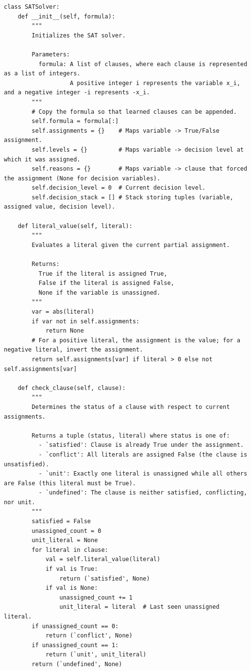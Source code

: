 \begin{lstlisting}
class SATSolver:
    def __init__(self, formula):
        """
        Initializes the SAT solver.
        
        Parameters:
          formula: A list of clauses, where each clause is represented as a list of integers.
                   A positive integer i represents the variable x_i, and a negative integer -i represents -x_i.
        """
        # Copy the formula so that learned clauses can be appended.
        self.formula = formula[:]  
        self.assignments = {}    # Maps variable -> True/False assignment.
        self.levels = {}         # Maps variable -> decision level at which it was assigned.
        self.reasons = {}        # Maps variable -> clause that forced the assignment (None for decision variables).
        self.decision_level = 0  # Current decision level.
        self.decision_stack = [] # Stack storing tuples (variable, assigned value, decision level).

    def literal_value(self, literal):
        """
        Evaluates a literal given the current partial assignment.
        
        Returns:
          True if the literal is assigned True,
          False if the literal is assigned False,
          None if the variable is unassigned.
        """
        var = abs(literal)
        if var not in self.assignments:
            return None
        # For a positive literal, the assignment is the value; for a negative literal, invert the assignment.
        return self.assignments[var] if literal > 0 else not self.assignments[var]

    def check_clause(self, clause):
        """
        Determines the status of a clause with respect to current assignments.
        
        Returns a tuple (status, literal) where status is one of:
          - `satisfied': Clause is already True under the assignment.
          - `conflict': All literals are assigned False (the clause is unsatisfied).
          - `unit': Exactly one literal is unassigned while all others are False (this literal must be True).
          - `undefined': The clause is neither satisfied, conflicting, nor unit.
        """
        satisfied = False
        unassigned_count = 0
        unit_literal = None
        for literal in clause:
            val = self.literal_value(literal)
            if val is True:
                return (`satisfied', None)
            if val is None:
                unassigned_count += 1
                unit_literal = literal  # Last seen unassigned literal.
        if unassigned_count == 0:
            return (`conflict', None)
        if unassigned_count == 1:
            return (`unit', unit_literal)
        return (`undefined', None)


\end{lstlisting}
